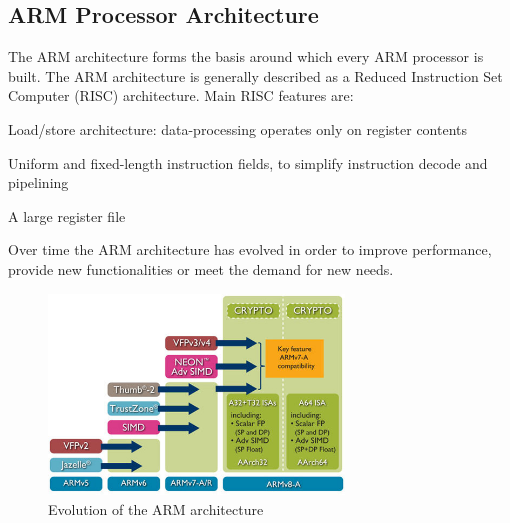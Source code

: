 \documentclass[pdftex,10pt,a4paper]{report}
\newenvironment{packed_item}{
\begin{itemize}
  \setlength{\itemsep}{1pt}
  \setlength{\parskip}{0pt}
  \setlength{\parsep}{0pt}
}{\end{itemize}}
\begin{document}
\subsection{ARM Processor Architecture}
The ARM architecture forms the basis around which every ARM processor is built. The ARM architecture is generally described as a Reduced Instruction Set Computer (RISC) architecture. Main RISC features are:
\begin{packed_item}
	\item Load/store architecture: data-processing operates only on register contents
	\item Uniform and fixed-length instruction fields, to simplify instruction decode and pipelining
	\item A large register file
\end{packed_item}

Over time the ARM architecture has evolved in order to improve performance, provide new functionalities or meet the demand for new needs.
\begin{figure}[h!]
\centering
\includegraphics[width=0.7\textwidth]{./arm_arch.jpg}
\caption{Evolution of the ARM architecture}
\label{Evolution of the ARM architecture}
\end{figure}
\end{document}
